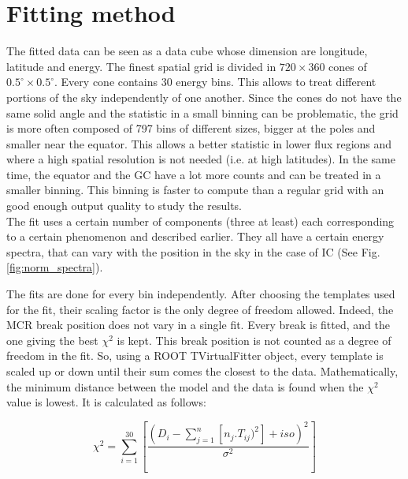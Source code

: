 \section{Fitting method}


The fitted data can be seen as a data cube whose dimension are longitude, latitude and energy. The finest spatial grid is divided in $720 \times 360$ cones of $ 0.5^\circ \times 0.5^\circ $. Every cone contains 30 energy bins. This allows to treat different portions of the sky independently of one another. Since the cones do not have the same solid angle and the statistic in a small binning can be problematic, the grid is more often composed of 797 bins of different sizes, bigger at the poles and smaller near the equator. This allows a better statistic in lower flux regions and where a high spatial resolution is not needed (i.e. at high latitudes). In the same time, the equator and the GC have a lot more counts and can be treated in a smaller binning. This binning is faster to compute than a regular grid with an good enough output quality to study the results.\\

The fit uses a certain number of components (three at least) each corresponding to a certain phenomenon and described earlier. They all have a certain energy spectra, that can vary with the position in the sky in the case of IC (See Fig. \ref{fig:norm_spectra}).

The fits are done for every bin independently. After choosing the templates used for the fit, their scaling factor is the only degree of freedom allowed. Indeed, the MCR break position does not vary in a single fit. Every break is fitted, and the one giving the best $\chi^2$ is kept. This break position is not counted as a degree of freedom in the fit. So, using a ROOT TVirtualFitter object, every template is scaled up or down until their sum comes the closest to the data.
Mathematically, the minimum distance between the model and the data is found when the $\chi^2$ value is lowest. It is calculated as follows:

\begin{equation}
\chi^2 = \sum_{i=1}^{30}[\frac{ \left( D_i - \sum_{j=1}^{n} \left[ n_j.T_{ij})^2 \right] + iso \right) ^2}{\sigma^2}]
\end{equation}

